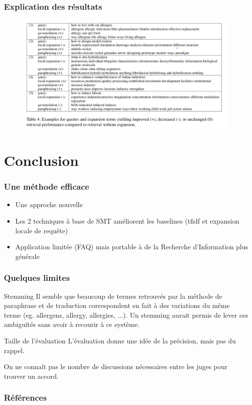 \documentclass[10pt]{beamer}
\begin{document}
\begin{frame}
  \frametitle{Explication des résultats}

  \begin{figure}[h]
    \centering
    \includegraphics[width=\textwidth]{table4}
    \label{fig:res}
  \end{figure}
\end{frame}

\section{Conclusion}
\label{sec:conclusion}


\begin{frame}
  \frametitle{Une méthode efficace}
  \begin{itemize}
    \item Une approche nouvelle
    \item Les 2 techniques à base de SMT améliorent les baselines (tfidf et expansion locale de requ\^ete)
    \item Application limitée (FAQ) mais portable à de la Recherche d'Information plus générale
  \end{itemize}
\end{frame}

\begin{frame}
  \frametitle{Quelques limites}

  \begin{block}{Stemming}
  Il semble que beaucoup de termes retrouvés par la méthode de
  paraphrase et de traduction correspondent en fait à des variations
  du même terme (eg. allergens, allergy, allergies, ...). Un stemming
  aurait permis de lever ces ambiguïtés sans avoir à recourir à ce système.
  \end{block}
  \begin{block}{Taille de l'évaluation}
    L'évaluation donne une idée de la précision, mais pas du rappel.
    
    On ne connaît pas le nombre de discussions nécessaires entre les
    juges pour trouver un accord.
  \end{block}
\end{frame}


\begin{frame}[allowbreaks]
  \frametitle{Références}
  
  
\end{frame}
\end{document}
